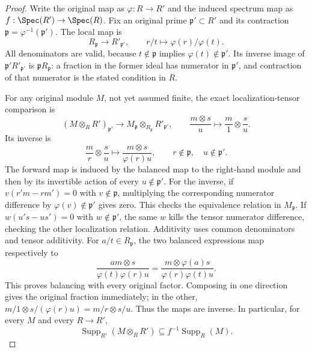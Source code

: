 \begin{proof}
Write the original map as $\varphi:R\to R'$ and the induced
spectrum map as $f:\Spec(R')\to\Spec(R)$.
Fix an original prime $\mathfrak p'\subset R'$ and its
contraction $\mathfrak p=\varphi^{-1}(\mathfrak p')$.
The local map is
$$
R_{\mathfrak p}\longrightarrow R'_{\mathfrak p'},
\qquad r/t\longmapsto\varphi(r)/\varphi(t).
$$
All denominators are valid, because $t\notin\mathfrak p$
implies $\varphi(t)\notin\mathfrak p'$. Its inverse image
of $\mathfrak p'R'_{\mathfrak p'}$ is
$\mathfrak pR_{\mathfrak p}$: a fraction in the former
ideal has numerator in $\mathfrak p'$, and contraction
of that numerator is the stated condition in $R$.

For any original module $M$, not yet assumed finite, the
exact localization-tensor comparison is
$$
(M\otimes_RR')_{\mathfrak p'}
\longrightarrow M_{\mathfrak p}\otimes_{R_{\mathfrak p}}R'_{\mathfrak p'},
\qquad \frac{m\otimes s}{u}\longmapsto\frac m1\otimes\frac su.
$$
Its inverse is
$$
\frac mr\otimes\frac su
\longmapsto\frac{m\otimes s}{\varphi(r)u},
\qquad r\notin\mathfrak p,\quad u\notin\mathfrak p'.
$$
The forward map is induced by the balanced map to the
right-hand module and then by its invertible action of
every $u\notin\mathfrak p'$. For the inverse, if
$v(r'm-rm')=0$ with $v\notin\mathfrak p$, multiplying
the corresponding numerator difference by
$\varphi(v)\notin\mathfrak p'$ gives zero. This checks
the equivalence relation in $M_{\mathfrak p}$. If
$w(u's-us')=0$ with $w\notin\mathfrak p'$, the same
$w$ kills the tensor numerator difference, checking the
other localization relation. Additivity uses common
denominators and tensor additivity. For $a/t\in R_{\mathfrak p}$,
the two balanced expressions map respectively to
$$
\frac{am\otimes s}{\varphi(t)\varphi(r)u}
=\frac{m\otimes\varphi(a)s}{\varphi(r)\varphi(t)u}.
$$
This proves balancing with every original factor. Composing
in one direction gives the original fraction immediately;
in the other, $m/1\otimes s/(\varphi(r)u)=m/r\otimes s/u$.
Thus the maps are inverse. In particular, for every $M$
and every $R\to R'$,
$$
\operatorname{Supp}_{R'}(M\otimes_RR')
\subseteq f^{-1}\operatorname{Supp}_R(M).
$$


\end{proof}
